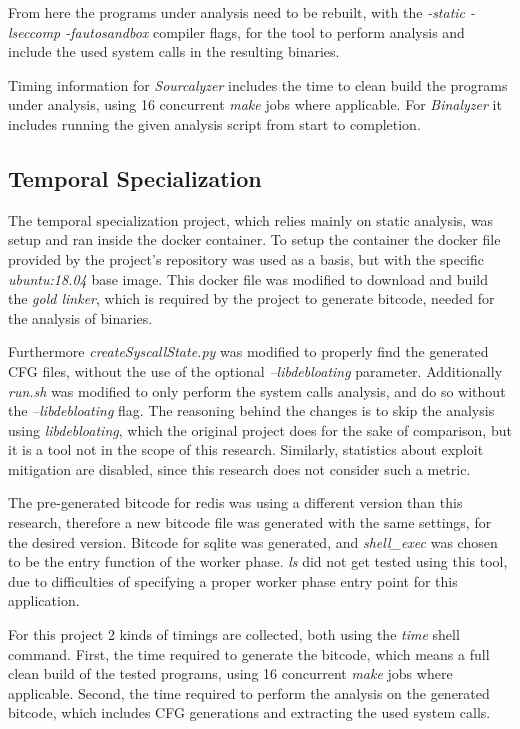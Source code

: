 From here the programs under analysis need to be rebuilt, with the \textit{-static -lseccomp -fautosandbox} compiler flags, for the tool to perform analysis and include the used system calls in the resulting binaries.

Timing information for \textit{Sourcalyzer} includes the time to clean build the programs under analysis, using 16 concurrent \textit{make} jobs where applicable. For \textit{Binalyzer} it includes running the given analysis script from start to completion.

\subsection {Temporal Specialization}
The temporal specialization \cite{ref_mp_1} project, which relies mainly on static analysis, was setup and ran inside the docker container.
To setup the container the docker file provided by the project's repository was used as a basis, but with the specific \textit{ubuntu:18.04} base image.
This docker file was modified to download and build the \textit{gold linker}, which is required by the project to generate bitcode, needed for the analysis of binaries.

Furthermore \textit{createSyscallState.py} was modified to properly find the generated CFG files, without the use of the optional \textit{--libdebloating} parameter.
Additionally \textit{run.sh} was modified to only perform the system calls analysis, and do so without the \textit{--libdebloating} flag.
The reasoning behind the changes is to skip the analysis using \textit{libdebloating}, which the original project does for the sake of comparison, but it is a tool not in the scope of this research.
Similarly, statistics about exploit mitigation are disabled, since this research does not consider such a metric.

The pre-generated bitcode for redis was using a different version than this research, therefore a new bitcode file was generated with the same settings, for the desired version.
Bitcode for sqlite was generated, and \textit{shell\_exec} was chosen to be the entry function of the worker phase.
\textit{ls} did not get tested using this tool, due to difficulties of specifying a proper worker phase entry point for this application.

For this project 2 kinds of timings are collected, both using the \textit{time} shell command.
First, the time required to generate the bitcode, which means a full clean build of the tested programs, using 16 concurrent \textit{make} jobs where applicable.
Second, the time required to perform the analysis on the generated bitcode, which includes CFG generations and extracting the used system calls.
